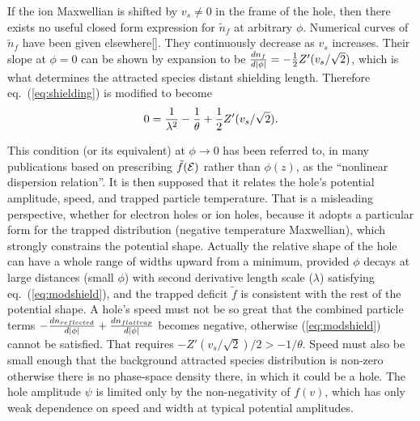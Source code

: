\documentclass[12pt]{article}  %
\def\energy{{\cal E}}
\begin{document}
If the ion Maxwellian is shifted by $v_s\not=0$ in the frame of the
hole, then there exists no useful closed form expression for
$\tilde n_f$ at arbitrary $\phi$. Numerical curves of $\tilde n_f$
have been given elsewhere[]. They continuously decrease as $v_s$
increases. Their slope at $\phi=0$ can be shown by expansion to be
${dn_f\over d|\phi|}=-{1 \over 2} Z'(v_s/\sqrt{2})$, which is what
determines the attracted species distant shielding length.  Therefore eq.\
(\ref{eq:shielding}) is modified to become
\begin{equation}
  \label{eq:modshield}
0={1\over \lambda^2}- {1\over \theta} + {1 \over 2} Z'(v_s/\sqrt{2}).  
\end{equation}

This condition (or its equivalent) at $\phi\to0$ has been referred to,
in many publications based on prescribing $\tilde f(\energy)$ rather
than $\phi(z)$, as the ``nonlinear dispersion relation''. It is then
supposed that it relates the hole's potential amplitude, speed, and
trapped particle temperature. That is a misleading perspective,
whether for electron holes or ion holes, because it adopts a
particular form for the trapped distribution (negative temperature
Maxwellian), which strongly constrains the potential shape. Actually
the relative shape of the hole can have a whole range of widths upward
from a minimum, provided $\phi$ decays at large distances (small
$\phi$) with second derivative length scale ($\lambda$) satisfying
eq.\ (\ref{eq:modshield}), and the trapped deficit $\tilde f$ is
consistent with the rest of the potential shape. A hole's speed must
not be so great that the combined particle terms
$-{dn_{reflected}\over d|\phi|}+{dn_{flattrap}\over d|\phi|}$ becomes
negative, otherwise (\ref{eq:modshield}) cannot be satisfied. That
requires $-Z'(v_s/\sqrt{2})/2>-1/\theta$. Speed must also be small
enough that the background attracted species distribution is non-zero
otherwise there is no phase-space density there, in which it could be
a hole. The hole amplitude $\psi$ is limited only by the
non-negativity of $f(v)$, which has only weak dependence on speed and
width at typical potential amplitudes.
\end{document}
